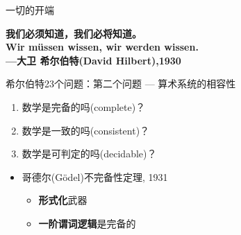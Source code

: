 \documentclass{myslide}
\begin{document}
\begin{frame}{一切的开端}
\begin{center}
\large\textbf{我们必须知道，我们必将知道。}\\
\textbf{Wir m\"ussen wissen, wir werden wissen.}\\
\qquad\qquad\qquad\qquad\qquad\textbf{---大卫 希尔伯特(David Hilbert),1930}
\end{center}
\pause
希尔伯特23个问题：第二个问题 --- 算术系统的相容性
\begin{enumerate}
	\item 数学是完备的吗(complete)？%
	\item 数学是一致的吗(consistent)？%
	\item 数学是可判定的吗(decidable)？%
\end{enumerate}
\pause
\begin{itemize}[<+->]
	\item 哥德尔(G\"odel)不完备性定理, 1931
	\begin{itemize}
		\item \textbf{形式化}武器
		\item \textbf{一阶谓词逻辑}是完备的
	\end{itemize}
\end{itemize}
\end{frame}
\end{document}
